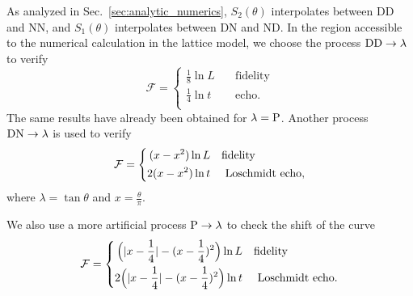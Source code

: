 As analyzed in Sec.~\ref{sec:analytic_numerics}, $S_2( \theta)$ interpolates between DD and NN, and $S_1( \theta )$ interpolates between DN and ND. In the region accessible to the numerical calculation in the lattice model, we choose the process ${\rm DD} \rightarrow  \lambda$ to verify
\begin{equation}
\label{eq:result_DDDD}
\mathcal{F} = 
\left\lbrace
\begin{aligned}
\frac{1}{8}\ln L  &\quad\text{fidelity}  \\
\frac{1}{4}\ln t   &\quad \text{echo} .  \\
\end{aligned} \right.  
\end{equation}
The same results have already been obtained for $\lambda = {\rm P}$\cite{stephan_logarithmic_2013,stephan_local_2011,vasseur_universal_2014,vasseur_crossover_2013,kennes_universal_2014}. Another process $\rm{DN} \rightarrow \lambda$ {\iffalse \color{red} in Eq.~\eqref{eq:DNDN}\fi} is used to verify
\begin{equation}
\label{eq:result_DNDN}
\mathcal{F} = 
\left\lbrace
\begin{aligned}
 (x - x^2 )\ln L   &  \quad {\rm fidelity} \\
 2(x - x^2 ) \ln t  & \quad \text{ Loschmidt echo} , \\
\end{aligned} \right. 
\end{equation}
where $\lambda = \tan \theta$ and $x = \frac{\theta}{\pi}$. 

We also use a more artificial process ${\rm P} \rightarrow \lambda$ to check the shift of the curve
\begin{equation}
\label{eq:periodic-case}
\mathcal{F} = 
\left\lbrace
\begin{aligned}
  \Big(|x-\frac{1}{4}| - (x-\frac{1}{4})^2 \Big)\ln L   &  \quad {\rm fidelity} \\
  2\Big(|x-\frac{1}{4}| - (x-\frac{1}{4})^2 \Big) \ln t  & \quad \text{ Loschmidt echo} .\\
\end{aligned} \right. 
\end{equation}



